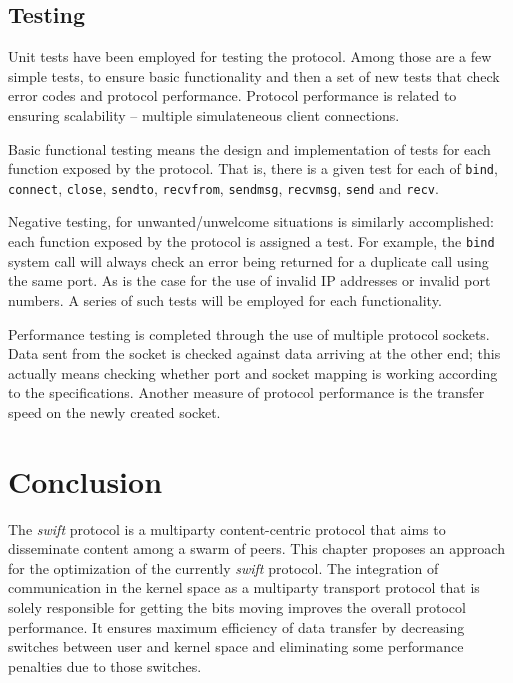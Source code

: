 \subsection{Testing}

Unit tests have been employed for testing the protocol. Among those are a few
simple tests, to ensure basic functionality and then a set of new tests that
check error codes and protocol performance. Protocol performance is related to
ensuring scalability -- multiple simulateneous client connections.

Basic functional testing means the design and implementation of tests for each
function exposed by the protocol. That is, there is a given test for each of
\texttt{bind}, \texttt{connect}, \texttt{close}, \texttt{sendto},
\texttt{recvfrom}, \texttt{sendmsg}, \texttt{recvmsg}, \texttt{send} and
\texttt{recv}.

Negative testing, for unwanted/unwelcome situations is similarly accomplished:
each function exposed by the protocol is assigned a test. For example, the
\texttt{bind} system call will always check an error being returned for a
duplicate call using the same port. As is the case for the use of invalid IP
addresses or invalid port numbers. A series of such tests will be employed for
each functionality.

Performance testing is completed through the use of multiple protocol sockets.
Data sent from the socket is checked against data arriving at the other
end; this actually means checking whether port and socket mapping is working
according to the specifications. Another measure of protocol performance is
the transfer speed on the newly created socket.

\section{Conclusion}
\label{sec:multiparty:conclusion}

The \textit{swift} protocol is a multiparty content-centric protocol that aims
to disseminate content among a swarm of peers. This chapter proposes an
approach for the optimization of the currently \textit{swift} protocol. The
integration of communication in the kernel space as a multiparty transport
protocol that is solely responsible for getting the bits moving improves the
overall protocol performance. It ensures maximum efficiency of data transfer
by decreasing switches between user and kernel space and eliminating some
performance penalties due to those switches.

